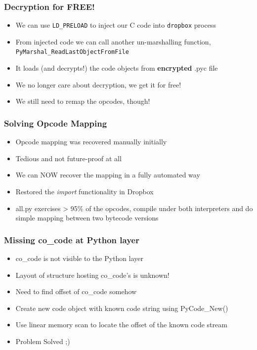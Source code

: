 \documentclass{beamer}
\begin{document}
\begin{frame}
\frametitle{Decryption for FREE!}
\begin{itemize}
\itemsep 2em
\item{We can use \texttt{LD\_PRELOAD} to inject our C code into \texttt{dropbox} process}
\item{From injected code we can call another un-marshalling function, \texttt{PyMarshal\_ReadLastObjectFromFile}}
\item{It loads (and decrypts!) the code objects from \textbf{encrypted} .pyc file}
\item{We no longer care about decryption, we get it for free!}
\item{We still need to remap the opcodes, though!}
\end{itemize}
\end{frame}

\begin{frame}
\frametitle{Solving Opcode Mapping}
\begin{itemize}
\itemsep 2em
\item{Opcode mapping was recovered manually initially}
\item{Tedious and not future-proof at all}
\item{We can NOW recover the mapping in a fully automated way}
\item{Restored the \emph{import} functionality in Dropbox}
\item{all.py exercises > 95\% of the opcodes, compile under both interpreters
and do simple mapping between two bytecode versions}
\end{itemize}
\end{frame}

\begin{frame}
\frametitle{Missing co\_code at Python layer}
\begin{itemize}
\itemsep 1.6em
\item{co\_code is not visible to the Python layer}
\item{Layout of structure hosting co\_code's is unknown!}
\item{Need to find offset of co\_code somehow}
\item{Create new code object with known code string using PyCode\_New()}
\item{Use linear memory scan to locate the offset of the known code stream}
\item{Problem Solved ;)}
\end{itemize}
\end{frame}
\end{document}

